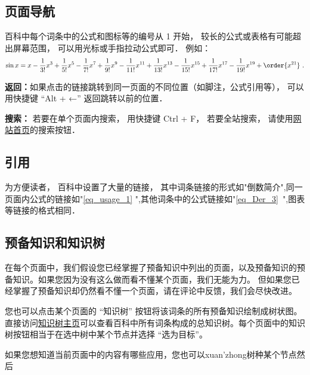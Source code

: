 
\subsection{页面导航}
百科中每个词条中的公式和图标等的编号从 1 开始， 较长的公式或表格有可能超出屏幕范围， 可以用光标或手指拉动公式即可． 例如：
\begin{equation}\label{eq_usage_1}
\sin x = x - \frac{1}{3!} x^3 + \frac{1}{5!} x^5 - \frac{1}{7!} x^7+\frac{1}{9!} x^9-\frac{1}{11!} x^{11}+\frac{1}{13!} x^{13}-\frac{1}{15!} x^{15}+\frac{1}{17!} x^{17}-\frac{1}{19!} x^{19}+ \order{x^{21}}~.
\end{equation}

\textbf{返回：}如果点击的链接跳转到同一页面的不同位置（如脚注，公式引用等）， 可以用快捷键 “Alt + ←” 返回跳转以前的位置．

\textbf{搜索：} 若要在单个页面内搜索， 用快捷键 Ctrl + F， 若要全站搜索， 请使用\href{https://wuli.wiki}{网站首页}的搜索按钮．

\subsection{引用}
为方便读者， 百科中设置了大量的链接， 其中词条链接的形式如"倒数简介",同一页面内公式的链接如"\autoref{eq_usage_1} ",其他词条中的公式链接如"\autoref{eq_Der_3}~",图表等链接的格式相同．

\subsection{预备知识和知识树}
在每个页面中，我们假设您已经掌握了预备知识中列出的页面，以及预备知识的预备知识。如果您因为没有这么做而看不懂某个页面，我们无能为力。 但如果您已经掌握了预备知识却仍然看不懂一个页面，请在评论中反馈，我们会尽快改进。

您也可以点击某个页面的 “知识树” 按钮将该词条的所有预备知识绘制成树状图。 直接访问\href{https://wuli.wiki/tree/}{知识树主页}可以查看百科中所有词条构成的总知识树。每个页面中的知识树按钮相当于在选中树中某个节点并选择 “选为目标”。

如果您想知道当前页面中的内容有哪些应用，您也可以xuan'zhong树种某个节点然后

